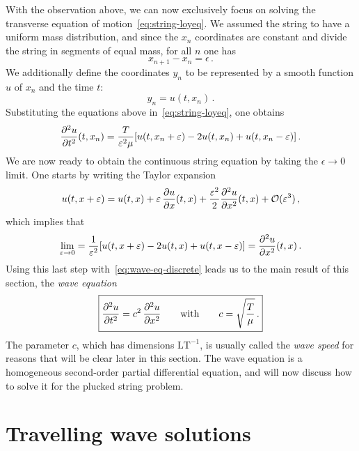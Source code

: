 With the observation above, we can now exclusively focus on solving the transverse
equation of motion~\cref{eq:string-loyeq}. We assumed the string to have a uniform mass
distribution, and since the $x_n$ coordinates are constant and divide the string in
segments of equal mass, for all $n$ one has
\begin{equation}
  x_{n+1}-x_n=\epsilon\,.
\end{equation}
We additionally define the coordinates $y_n$ to be represented by a smooth function $u$ of
$x_n$ and the time $t$:
\begin{equation}
  y_n=u(t,x_n)\,.
\end{equation}
Substituting the equations above in~\cref{eq:string-loyeq}, one obtains
\begin{equation}
  \frac{\partial^{2} u}{\partial t^{2}}(t,x_n)=\frac{T}{\varepsilon^2\mu}
  [u(t,x_{n}+\varepsilon)-2u(t,x_{n})+u(t,x_{n}-\varepsilon)]\,.\label{eq:wave-eq-discrete}
\end{equation}
We are now ready to obtain the continuous string equation by taking the $\epsilon\to 0$
limit. One starts by writing the Taylor expansion
\begin{equation}
  u(t,x+\varepsilon)=u(t,x)+\varepsilon\,\frac{\partial u}{\partial x}(t,x)
  +\frac{\varepsilon^2}{2}\frac{\partial^{2} u}{\partial x^{2}}(t,x)+\mathcal{O}(\varepsilon^3)\,,
\end{equation}
which implies that
\begin{equation}
  \lim_{\varepsilon\to 0}=\frac{1}{\varepsilon^2}
  [u(t,x+\varepsilon)-2u(t,x)+u(t,x-\varepsilon)]=\frac{\partial^{2} u}{\partial x^{2}}(t,x)\,.
\end{equation}
Using this last step with~\cref{eq:wave-eq-discrete} leads us to the main result of this
section, the \emph{wave equation}
\begin{equation}
  \boxed{
    \frac{\partial^{2} u}{\partial t^{2}}=c^2\,\frac{\partial^{2} u}{\partial x^{2}}
    \qquad\text{with}\qquad
  c=\sqrt{\frac{T}{\mu}}\,.}
  \label{eq:wave-eq}
\end{equation}
The parameter $c$, which has dimensions $\mathrm{L}\mathrm{T}^{-1}$, is usually called the
\emph{wave speed} for reasons that will be clear later in this section. The wave equation
is a homogeneous second-order partial differential equation, and will now discuss how to
solve it for the plucked string problem.
\section{Travelling wave solutions}
\label{sec:wave-eq-travelling}
